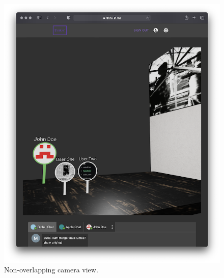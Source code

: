 \begin{figure}[H]
	\centering
	\includegraphics[width=\textwidth,keepaspectratio]{images/frontend/overlapping-fixed.png}
	\caption{Non-overlapping camera view.}
	\label{figure:frontend-overlapping-fixed}
\end{figure}



